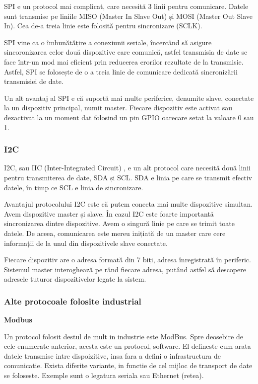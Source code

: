 SPI e un protocol mai complicat, care necesită 3 linii pentru comunicare. Datele
sunt transmise pe liniile MISO (Master In
Slave Out) și MOSI  (Master Out Slave In). Cea
de-a treia linie este folosită pentru sincronizare (SCLK).

SPI vine ca o îmbunătățire a conexiunii seriale, încercând să asigure
sincoronizarea celor două dispozitive care comunică, astfel transmisia de date
se face într-un mod mai eficient prin reducerea erorilor rezultate de la
transmisie. Astfel, SPI se folosește de o a treia linie de comunicare dedicată
sincronizării transmisiei de date.

Un alt avantaj al SPI e că suportă mai multe periferice, denumite slave,
conectate la un dispozitiv principal, numit master. Fiecare dispozitiv este
activat sau dezactivat la un moment dat folosind un pin GPIO oarecare setat la
valoare 0 sau 1.

\subsubsection{I2C}
\label{sec:embed-bus-wire-i2c}

I2C, sau IIC (Inter-Integrated Circuit) , e un
alt protocol care necesită două linii pentru transmiterea de date, SDA și SCL.
SDA e linia pe care se transmit efectiv datele, în timp ce SCL e linia de
sincronizare.

Avantajul protocolului I2C este că putem conecta mai multe dispozitive simultan.
Avem dispozitive master și slave. În cazul I2C este foarte importantă
sincronizarea dintre dispozitive. Avem o singură linie pe care se trimit toate
datele. De aceea, comunicarea este mereu inițiată de un master care cere
informații de la unul din dispozitivele slave conectate.

Fiecare dispozitiv are o adresa formată din 7 biți, adresa înregistrată în
periferic. Sistemul master interoghează pe rând fiecare adresa, putând astfel să
descopere adresele tuturor dispozitivelor legate la sistem.

\subsubsection{Alte protocoale folosite industrial}
\label{sec:embed-bus-wire-other}

\textbf{Modbus}

Un protocol folosit destul de mult in industrie este ModBus. Spre deosebire de
cele enumerate anterior, acesta este un protocol, software. El defineste cum
arata datele transmise intre dispoizitive, insa fara a defini o infrastructura
de comunicatie. Exista diferite variante, in functie de cel mijloc de transport
de date se foloseste. Exemple sunt o legatura seriala sau Ethernet (retea).

